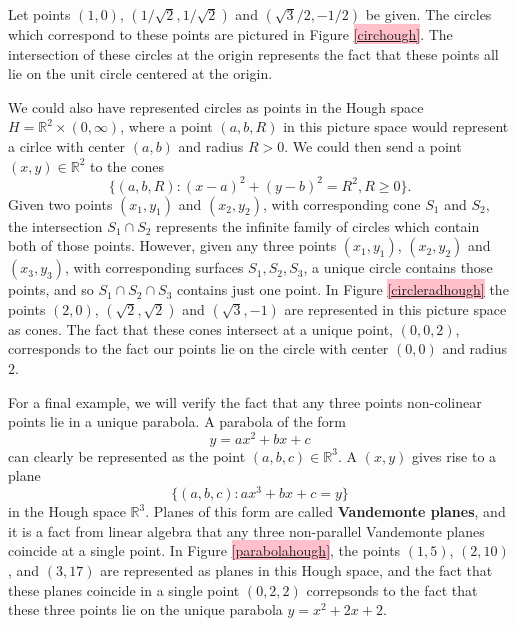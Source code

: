 \documentclass[a4paper,11pt,twoside]{article}
\theoremstyle{definition}
\theoremstyle{remark}
\newcommand{\sh}[1]{\colorbox{pink}{#1}}
\newcommand{\lnk}[1]{\sh{\hyperref[#1]{\ref*{#1}}}}
\begin{document}
Let points $(1,0)$, $(1/\sqrt{2},1/\sqrt{2})$ and $(\sqrt{3}/2,-1/2)$ be given. The circles which correspond to these points are pictured in Figure \lnk{circhough}. The intersection of these circles at the origin represents the fact that these points all lie on the unit circle centered at the origin.

We could also have represented circles as points in the Hough space $H = \mathbb{R}^2\times(0,\infty)$, where a point $(a,b,R)$ in this picture space would represent a cirlce with center $(a,b)$ and radius $R>0$. We could then send a point $(x,y)\in\mathbb{R}^2$ to the cones
\begin{displaymath}
\{(a,b,R):(x-a)^2+(y-b)^2=R^2, R\geqslant 0\}.
\end{displaymath}
Given two points $(x_1,y_1)$ and $(x_2,y_2)$, with corresponding cone $S_1$ and $S_2$, the intersection $S_1\cap S_2$ represents the infinite family of circles which contain both of those points. However, given any three points $(x_1,y_1)$, $(x_2,y_2)$ and $(x_3,y_3)$, with corresponding surfaces $S_1,S_2,S_3$, a unique circle contains those points, and so $S_1\cap S_2\cap S_3$ contains just one point. In Figure \lnk{circleradhough} the points $(2,0)$, $(\sqrt{2},\sqrt{2})$ and $(\sqrt{3},-1)$ are represented in this picture space as cones. The fact that these cones intersect at a unique point, $(0,0,2)$, corresponds to the fact our points lie on the circle with center $(0,0)$ and radius $2$.

For a final example, we will verify the fact that any three points non-colinear points lie in a unique parabola. A parabola of the form
\begin{displaymath}
y = ax^2+bx+c
\end{displaymath}
can clearly be represented as the point $(a,b,c)\in\mathbb{R}^3$. A $(x,y)$ gives rise to a plane
\begin{displaymath}
\{(a,b,c):ax^3+bx+c=y\}
\end{displaymath}
in the Hough space $\mathbb{R}^3$. Planes of this form are called \textbf{Vandemonte planes}, and it is a fact from linear algebra that any three non-parallel Vandemonte planes coincide at a single point. In Figure \lnk{parabolahough}, the points $(1,5)$, $(2,10)$, and $(3,17)$ are represented as planes in this Hough space, and the fact that these planes coincide in a single point $(0,2,2)$ correpsonds to the fact that these three points lie on the unique parabola $y=x^2+2x+2$.
\end{document}
